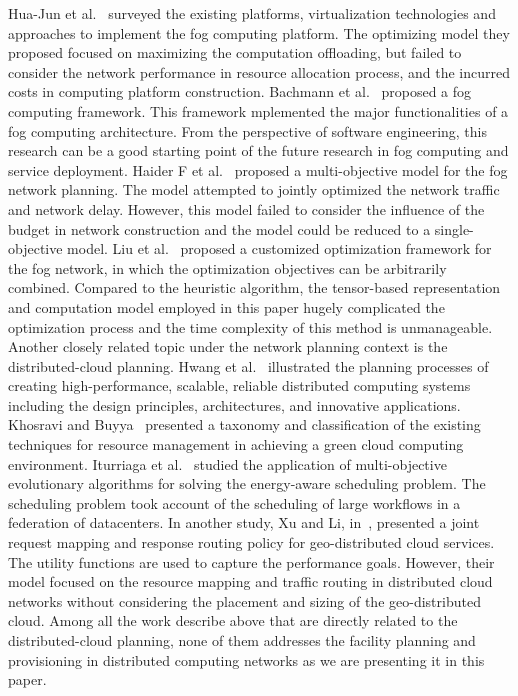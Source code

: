 \documentclass[10pt,journal,compsoc]{IEEEtran}
\begin{document}
Hua-Jun et al.~\cite{hong2016dynamic} surveyed the existing platforms, virtualization technologies and approaches to implement the fog computing platform. The optimizing model they proposed focused on maximizing the computation offloading, but failed to consider the network performance in resource allocation process, and the incurred costs in computing platform construction.
Bachmann et al.~\cite{bachmann2017design} proposed a fog computing framework. This framework mplemented the major functionalities of a fog computing architecture. From the perspective of software engineering, this research can be a good starting point of the future research in fog computing and service deployment.
Haider F et al.~\cite{haider2017planning} proposed a multi-objective model for the fog network planning. The model attempted to jointly optimized the network traffic and network delay. However, this model failed to consider the influence of the budget in network construction and the model could be reduced to a single-objective model.
Liu et al.~\cite{liu2018tensor} proposed a customized optimization framework for the fog network, in which the optimization objectives can be arbitrarily combined. Compared to the heuristic algorithm, the tensor-based representation and computation model employed in this paper hugely complicated the optimization process and the time complexity of this method is unmanageable.
Another closely related topic under the network planning context is the distributed-cloud planning. 
Hwang et al.~\cite{hwang2013distributed} illustrated the planning processes of creating high-performance, scalable, reliable distributed computing systems including the design principles, architectures, and innovative applications. 
Khosravi and Buyya~\cite{enerfoot} presented a taxonomy and classification of the existing techniques for resource management in achieving a green cloud computing environment. 
Iturriaga et al.~\cite{ITOR:ITOR12294} studied the application of multi-objective evolutionary algorithms for solving the energy-aware scheduling problem. The scheduling problem took account of the scheduling of large workflows in a federation of datacenters. In another study, Xu and Li, in~\cite{6566873}, presented a joint request mapping and response routing policy for geo-distributed cloud services. The utility functions are used to capture the performance goals. However, their model focused on the resource mapping and traffic routing in distributed cloud networks without considering the placement and sizing of the geo-distributed cloud. 
Among all the work describe above that are directly related to the distributed-cloud planning, none of them addresses the facility planning and provisioning in distributed computing networks as we are presenting it in this paper.
\end{document}
